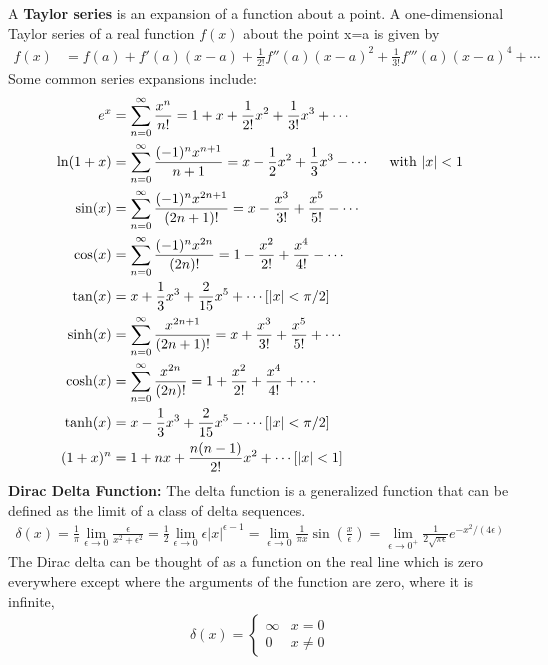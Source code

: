 A \textbf{Taylor series} is an expansion of a function about a point. A one-dimensional Taylor series of a real function $f(x)$ about the point x=a is given by 
\begin{align}
f(x)&=f(a)+f'(a)(x-a)+\frac{1}{2!}f''(a)(x-a)^2+\frac{1}{3!}f'''(a)(x-a)^4+\cdots 
\end{align}
Some common series expansions include: 
\begin{align}
e^x&=\sum_{n=0}^{\infty} \frac{x^n}{n!}=1+x+\frac{1}{2!}x^2 +\frac{1}{3!}x^3 +\cdots \\ 
\ln(1+x)&=\sum_{n=0}^{\infty} \frac{(-1)^{n}x^{n+1}}{n+1}=x-\frac{1}{2}x^2 +\frac{1}{3}x^3 -\cdots\hspace{0.5cm} \textrm{with }|x|<1\\ 
\sin(x)&=\sum_{n=0}^{\infty}\frac{(-1)^{n}x^{2n+1}}{(2n+1)!} = x-\frac{x^3}{3!}+\frac{x^5}{5!}-\cdots \\
\cos(x)&=\sum_{n=0}^{\infty}\frac{(-1)^{n}x^{2n}}{(2n)!} = 1-\frac{x^2}{2!}+\frac{x^4}{4!}-\cdots \\
\tan(x)&= x+\frac{1}{3}x^3+\frac{2}{15}x^5+\cdots[|x|<\pi/2] \\
\sinh(x)&=\sum_{n=0}^{\infty}\frac{x^{2n+1}}{(2n+1)!} = x+\frac{x^3}{3!}+\frac{x^5}{5!}+\cdots \\
\cosh(x)&=\sum_{n=0}^{\infty}\frac{x^{2n}}{(2n)!} = 1+\frac{x^2}{2!}+\frac{x^4}{4!}+\cdots \\
\tanh(x)&= x-\frac{1}{3}x^3+\frac{2}{15}x^5-\cdots[|x|<\pi/2]\\
(1+x)^n&=1+nx+\frac{n(n-1)}{2!}x^2+\cdots[|x| < 1]
\end{align}	
\textbf{Dirac Delta Function:} The delta function is a generalized function that can be defined as the limit of a class of delta sequences.
\begin{align}
	\delta(x) = \frac{1}{\pi}\lim_{\epsilon\rightarrow 0}\frac{\epsilon}{x^2+\epsilon^2} = \frac{1}{2}\lim_{\epsilon\rightarrow 0}\epsilon|x|^{\epsilon-1} =\lim_{\epsilon\rightarrow 0} \frac{1}{\pi x}\sin\left(\frac{x}{\epsilon}\right) = \lim_{\epsilon\rightarrow 0^+}\frac{1}{2\sqrt{\pi \epsilon}}e^{-x^2/(4\epsilon)}
\end{align}
The Dirac delta can be thought of as a function on the real line which is zero everywhere except where the arguments of the function are zero, where it is infinite,
\begin{align}
	\delta(x) = 
	\begin{cases} 
		\infty & x=0 \\
			 0 & x \neq 0 
	\end{cases}
\end{align}
